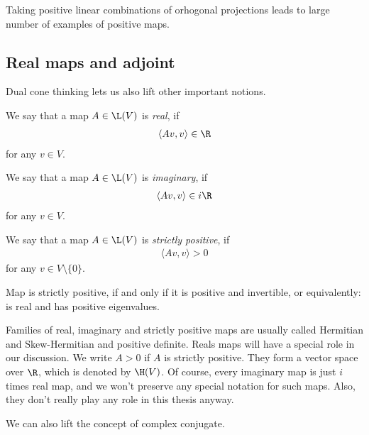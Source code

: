 Taking positive linear combinations of orhogonal projections leads to large number of examples of positive maps.

\subsection{Real maps and adjoint}

Dual cone thinking lets us also lift other important notions.

\begin{maar}
	We say that a map $A \in \L(V)$ is \textit{real}, if
	\begin{align*}
		\langle A v, v \rangle \in \R
	\end{align*}
	for any $v \in V$.
\end{maar}

\begin{maar}
	We say that a map $A \in \L(V)$ is \textit{imaginary}, if
	\begin{align*}
		\langle A v, v \rangle \in i \R
	\end{align*}
	for any $v \in V$.
\end{maar}

\begin{maar}
	We say that a map $A \in \L(V)$ is \textit{strictly positive}, if
	\begin{align*}
		\langle A v, v \rangle > 0
	\end{align*}
	for any $v \in V \setminus \{0\}$.
\end{maar}

Map is strictly positive, if and only if it is positive and invertible, or equivalently: is real and has positive eigenvalues.

Families of real, imaginary and strictly positive maps are usually called Hermitian and Skew-Hermitian and positive definite. Reals maps will have a special role in our discussion. We write $A > 0$ if $A$ is strictly positive. They form a vector space over $\R$, which is denoted by $\H(V)$. Of course, every imaginary map is just $i$ times real map, and we won't preserve any special notation for such maps. Also, they don't really play any role in this thesis anyway.

We can also lift the concept of complex conjugate.


